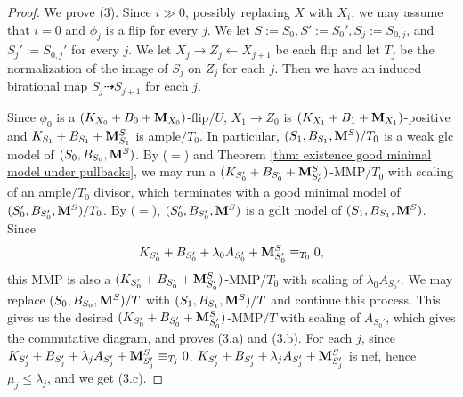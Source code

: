 \documentclass[11pt]{amsart}
\numberwithin{equation}{section}
\newcommand{\Mm}{{\bf{M}}}
\theoremstyle{definition}
\theoremstyle{definition}
\theoremstyle{definition}
\begin{document}
\begin{proof}
We prove (3). Since $i\gg 0$, possibly replacing $X$ with $X_i$, we may assume that $i=0$ and $\phi_{j}$ is a flip for every $j$. We let $S:=S_0,S':=S_0',S_j:=S_{0,j}$, and $S_j':=S_{0,j}'$ for every $j$. We let $X_j\rightarrow Z_j\leftarrow X_{j+1}$ be each flip and let $T_j$ be the normalization of the image of $S_{j}$ on $Z_j$ for each $j$. Then we have an induced birational map $S_{j}\dashrightarrow S_{j+1}$ for each $j$.

Since $\phi_{0}$ is a $(K_{X_0}+B_0+\Mm_{X_0})$-flip$/U$, $X_{1}\rightarrow Z_0$ is $(K_{X_{1}}+B_1+\Mm_{X_1})$-positive and $K_{S_1}+B_{S_1}+\Mm^S_{S_1}$ is ample$/T_0$. In particular, $(S_1,B_{S_1},\Mm^S)/T_0$ is a weak glc model of $(S_0,B_{S_0},\Mm^S)$. By \cite[Lemmas 3.5, 3.8]{HL21} ($=$\cite[Version 3, Lemmas 3.9, 3.15]{HL21}) and Theorem \ref{thm: existence good minimal model under pullbacks}, we may run a $(K_{S_0'}+B_{S_0'}+\Mm^{S}_{S_0'})$-MMP$/T_0$ with scaling of an ample$/T_0$ divisor, which terminates with a good minimal model of $(S_0',B_{S_0'},\Mm^S)/T_0$. By \cite[Lemma 3.5]{HL21} ($=$\cite[Version 3, Lemma 3.9]{HL21}), $(S_0',B_{S_0'},\Mm^S)$ is a gdlt model of $(S_1,B_{S_1},\Mm^S)$. Since 
$$K_{S_0'}+B_{S_0'}+\lambda_0A_{S_0'}+\Mm^{S}_{S_0'}\equiv_{T_0}0,$$
 this MMP is also a $(K_{S_0'}+B_{S_0'}+\Mm^{S}_{S_0'})$-MMP$/T_0$ with scaling of $\lambda_0A_{S_0'}$. 
 We may replace $(S_0,B_{S_0},\Mm^S)/T$ with $(S_1,B_{S_1},\Mm^S)/T$ and continue this process. This gives us the desired $(K_{S_0'}+B_{S_0'}+\Mm^{S}_{S_0'})$-MMP$/T$ with scaling of $A_{S_0'}$, which gives the commutative diagram, and proves (3.a) and (3.b). For each $j$, since $K_{S_j'}+B_{S_j'}+\lambda_jA_{S_j'}+\Mm^{S}_{S_j'}\equiv_{T_j}0$, 
 $K_{S_j'}+B_{S_j'}+\lambda_jA_{S_j'}+\Mm^{S}_{S_j'}$ is nef, hence $\mu_j\leq\lambda_j$, and we get (3.c).
\end{proof}
\end{document}
